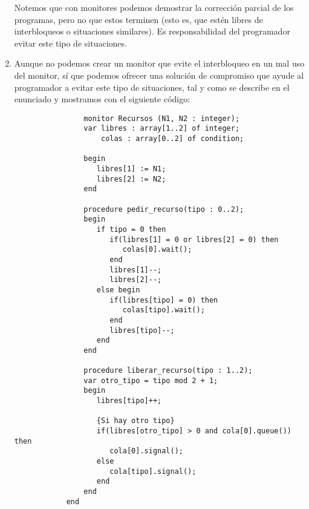 \begin{ejercicio}
\begin{enumerate}
                Notemos que con monitores podemos demostrar la corrección parcial de los programas, pero no que estos terminen (esto es, que estén libres de interbloqueos o situaciones similares). Es responsabilidad del programador evitar este tipo de situaciones.

        \item Aunque no podemos crear un monitor que evite el interbloqueo en un mal uso del monitor, sí que podemos ofrecer una solución de compromiso que ayude al programador a evitar este tipo de situaciones, tal y como se describe en el enunciado y mostramos con el siguiente código:
            \begin{verbatim}
                monitor Recursos (N1, N2 : integer);
                var libres : array[1..2] of integer;
                    colas : array[0..2] of condition;

                begin
                   libres[1] := N1;
                   libres[2] := N2;
                end

                procedure pedir_recurso(tipo : 0..2);
                begin
                   if tipo = 0 then
                      if(libres[1] = 0 or libres[2] = 0) then
                         colas[0].wait();
                      end
                      libres[1]--;
                      libres[2]--;
                   else begin
                      if(libres[tipo] = 0) then
                         colas[tipo].wait();
                      end
                      libres[tipo]--;
                   end
                end

                procedure liberar_recurso(tipo : 1..2);
                var otro_tipo = tipo mod 2 + 1;
                begin
                   libres[tipo]++;

                   {Si hay otro tipo}
                   if(libres[otro_tipo] > 0 and cola[0].queue()) then
                      cola[0].signal();
                   else
                      cola[tipo].signal();
                   end
                end
            end
            \end{verbatim}
    \end{enumerate}
\end{ejercicio}

